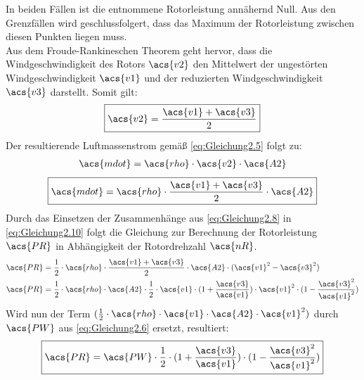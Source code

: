 In beiden Fällen ist die entnommene Rotorleistung annähernd Null. Aus den Grenzfällen wird geschlussfolgert, dass das Maximum der Rotorleistung zwischen diesen Punkten liegen muss.\\
Aus dem Froude-Rankineschen Theorem geht hervor, dass die Windgeschwindigkeit des Rotors $\acs{v2}$ den Mittelwert der ungestörten Windgeschwindigkeit $\acs{v1}$ und der reduzierten Windgeschwindigkeit $\acs{v3}$ darstellt. Somit gilt:
\begin{equation}\label{eq:Gleichung2.9}
    \boxed{\acs{v2} = \frac{\acs{v1} + \acs{v3}}{2}}
\end{equation}
\newline
Der resultierende Luftmassenstrom gemäß \autoref{eq:Gleichung2.5} folgt zu:
\begin{align*}
    \acs{mdot} = \acs{rho} \cdot \acs{v2} \cdot \acs{A2}
\end{align*}
\begin{equation}\label{eq:Gleichung2.10}
    \boxed{\acs{mdot} = \acs{rho} \cdot \frac{\acs{v1} + \acs{v3}}{2} \cdot \acs{A2}}
\end{equation}
\newline
Durch das Einsetzen der Zusammenhänge aus \autoref{eq:Gleichung2.8} in \autoref{eq:Gleichung2.10} folgt die Gleichung zur Berechnung der Rotorleistung $\acs{PR}$ in Abhängigkeit der Rotordrehzahl $\acs{nR}$.
\begin{align*}
    \acs{PR} &= \frac{1}{2} \cdot \acs{rho} \cdot \frac{\acs{v1} + \acs{v3}}{2} \cdot \acs{A2} \cdot (\acs{v1}^2 - \acs{v3}^2) \\
    \acs{PR} &= \frac{1}{2} \cdot \acs{rho} \cdot \acs{A2} \cdot \frac{1}{2} \cdot \acs{v1} \cdot (1 + \frac{\acs{v3}}{\acs{v1}}) \cdot \acs{v1}^2 \cdot (1 - \frac{\acs{v3}^2}{\acs{v1}^2})
\end{align*}
\newline
Wird nun der Term $(\frac{1}{2} \cdot \acs{rho} \cdot \acs{v1} \cdot \acs{A2} \cdot \acs{v1}^2)$ durch $\acs{PW}$ aus \autoref{eq:Gleichung2.6} ersetzt, resultiert:
\begin{equation}\label{eq:Gleichung2.11}
    \boxed{\acs{PR} = \acs{PW} \cdot \frac{1}{2} \cdot (1 + \frac{\acs{v3}}{\acs{v1}}) \cdot (1 - \frac{\acs{v3}^2}{\acs{v1}^2})}
\end{equation}

